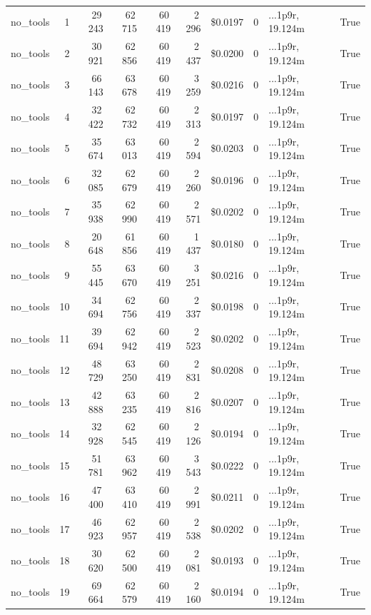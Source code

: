 \documentclass[a4paper,11pt]{article}
\begin{document}
\begin{table}[H]
{\begin{tabular}{l r r r r r r r l r}
\midrule
no\_tools & 1 & 29\,243 & 62\,715 & 60\,419 & 2\,296 & \$0.0197 & 0 & ...1p9r, 19.124m & True \\
no\_tools & 2 & 30\,921 & 62\,856 & 60\,419 & 2\,437 & \$0.0200 & 0 & ...1p9r, 19.124m & True \\
no\_tools & 3 & 66\,143 & 63\,678 & 60\,419 & 3\,259 & \$0.0216 & 0 & ...1p9r, 19.124m & True \\
no\_tools & 4 & 32\,422 & 62\,732 & 60\,419 & 2\,313 & \$0.0197 & 0 & ...1p9r, 19.124m & True \\
no\_tools & 5 & 35\,674 & 63\,013 & 60\,419 & 2\,594 & \$0.0203 & 0 & ...1p9r, 19.124m & True \\
no\_tools & 6 & 32\,085 & 62\,679 & 60\,419 & 2\,260 & \$0.0196 & 0 & ...1p9r, 19.124m & True \\
no\_tools & 7 & 35\,938 & 62\,990 & 60\,419 & 2\,571 & \$0.0202 & 0 & ...1p9r, 19.124m & True \\
no\_tools & 8 & 20\,648 & 61\,856 & 60\,419 & 1\,437 & \$0.0180 & 0 & ...1p9r, 19.124m & True \\
no\_tools & 9 & 55\,445 & 63\,670 & 60\,419 & 3\,251 & \$0.0216 & 0 & ...1p9r, 19.124m & True \\
no\_tools & 10 & 34\,694 & 62\,756 & 60\,419 & 2\,337 & \$0.0198 & 0 & ...1p9r, 19.124m & True \\
no\_tools & 11 & 39\,694 & 62\,942 & 60\,419 & 2\,523 & \$0.0202 & 0 & ...1p9r, 19.124m & True \\
no\_tools & 12 & 48\,729 & 63\,250 & 60\,419 & 2\,831 & \$0.0208 & 0 & ...1p9r, 19.124m & True \\
no\_tools & 13 & 42\,888 & 63\,235 & 60\,419 & 2\,816 & \$0.0207 & 0 & ...1p9r, 19.124m & True \\
no\_tools & 14 & 32\,928 & 62\,545 & 60\,419 & 2\,126 & \$0.0194 & 0 & ...1p9r, 19.124m & True \\
no\_tools & 15 & 51\,781 & 63\,962 & 60\,419 & 3\,543 & \$0.0222 & 0 & ...1p9r, 19.124m & True \\
no\_tools & 16 & 47\,400 & 63\,410 & 60\,419 & 2\,991 & \$0.0211 & 0 & ...1p9r, 19.124m & True \\
no\_tools & 17 & 46\,923 & 62\,957 & 60\,419 & 2\,538 & \$0.0202 & 0 & ...1p9r, 19.124m & True \\
no\_tools & 18 & 30\,620 & 62\,500 & 60\,419 & 2\,081 & \$0.0193 & 0 & ...1p9r, 19.124m & True \\
no\_tools & 19 & 69\,664 & 62\,579 & 60\,419 & 2\,160 & \$0.0194 & 0 & ...1p9r, 19.124m & True \\

\end{tabular}}
\end{table}
\end{document}
